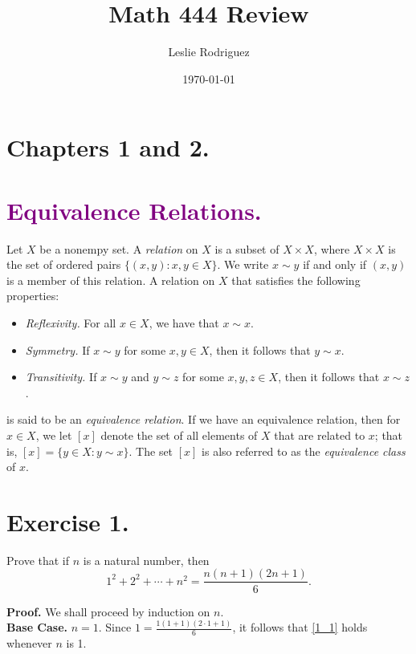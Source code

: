 \documentclass{article}
\title{Math 444 Review}
\author{Leslie Rodriguez}
\date{\today}
\newcommand{\D}{\displaystyle}
\begin{document}
   \maketitle

   \section*{Chapters 1 and 2.}

   \section*{\textcolor{purple}{Equivalence Relations.}} Let $X$ be a nonempy 
   set. A \textit{relation} on $X$ is a subset of $X \times X$, where
   $X \times X$ is the set of ordered pairs $\{(x, y) : x, y \in X\}$. We write 
   $x \sim y$ if and only if $(x, y)$ is a member of this relation. A relation
   on $X$ that satisfies the following properties:
   \begin{itemize}
      \item \textit{Reflexivity.} For all $x \in X$, we have that $x \sim x$.
      \item \textit{Symmetry.} If $x \sim y$ for some $x, y \in X$, then it
            follows that $y \sim x$.
      \item \textit{Transitivity.} If $x \sim y$ and $y \sim z$ for some
            $x, y, z \in X$, then it follows that $x \sim z$.
   \end{itemize}
   is said to be an \textit{equivalence relation}. If we have an equivalence
   relation, then for $x \in X$, we let $[x]$ denote the set of all elements of
   $X$ that are related to $x$; that is, $[x] = \{y \in X: y \sim x\}$. The set
   $[x]$ is also referred to as the \textit{equivalence class} of $x$.

   \section*{Exercise 1.} Prove that if $n$ is a natural number, then
   \begin{equation}
      1^2 + 2^2 + \cdots + n^2 = \D\frac{n(n+1)(2n+1)}{6}. \label{1_1}
   \end{equation}

   \textbf{Proof.} We shall proceed by induction on $n$. \\

   \textbf{Base Case.} $n = 1$. Since $1 = \D\frac{1(1 + 1)(2\cdot1+1)}{6}$, it 
   follows that \eqref{1_1} holds whenever $n$ is 1. \\
\end{document}
